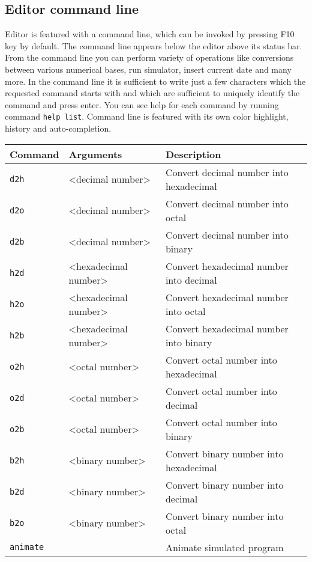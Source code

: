 \documentclass[a4paper,twoside,12pt]{book}
\newcommand{\mysmallfont}{\fontsize{8pt}{10pt} \selectfont{}}
\begin{document}
		\subsection{Editor command line}
			Editor is featured with a command line, which can be invoked by pressing F10 key by default. The command line appears below the editor above its status bar. From the command line you can perform variety of operations like conversions between various numerical bases, run simulator, insert current date and many more. In the command line it is sufficient to write just a few characters which the requested command starts with and which are sufficient to uniquely identify the command and press enter. You can see help for each command by running command \texttt{help list}. Command line is featured with its own color highlight, history and auto-completion.
			{
			\mysmallfont{}
			\begin{longtable}{l|ll}
				\textbf{Command} & \textbf{Arguments} & \textbf{Description} \\\hline
				\endhead
				\texttt{d2h}		& <decimal number>	& Convert decimal number into hexadecimal		\\
				\texttt{d2o}		& <decimal number>	& Convert decimal number into octal			\\
				\texttt{d2b}		& <decimal number>	& Convert decimal number into binary			\\
				\texttt{h2d}		& <hexadecimal number>	& Convert hexadecimal number into decimal		\\
				\texttt{h2o}		& <hexadecimal number>	& Convert hexadecimal number into octal			\\
				\texttt{h2b}		& <hexadecimal number>	& Convert hexadecimal number into binary		\\
				\texttt{o2h}		& <octal number>	& Convert octal number into hexadecimal			\\
				\texttt{o2d}		& <octal number>	& Convert octal number into decimal			\\
				\texttt{o2b}		& <octal number>	& Convert octal number into binary			\\
				\texttt{b2h}		& <binary number>	& Convert binary number into hexadecimal		\\
				\texttt{b2d}		& <binary number>	& Convert binary number into decimal			\\
				\texttt{b2o}		& <binary number>	& Convert binary number into octal			\\
				\texttt{animate}	&			& Animate simulated program				\\

\end{longtable}}
\end{document}
